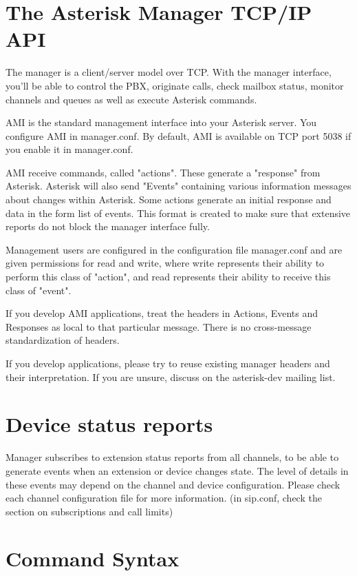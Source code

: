 \section{The Asterisk Manager TCP/IP API}

The manager is a client/server model over TCP. With the manager interface,
you'll be able to control the PBX, originate calls, check mailbox status,
monitor channels and queues as well as execute Asterisk commands.

AMI is the standard management interface into your Asterisk server.
You configure AMI in manager.conf. By default, AMI is available on
TCP port 5038 if you enable it in manager.conf.

AMI receive commands, called "actions". These generate a "response"
from Asterisk. Asterisk will also send "Events" containing various
information messages about changes within Asterisk. Some actions
generate an initial response and data in the form list of events.
This format is created to make sure that extensive reports do not
block the manager interface fully.

Management users are configured in the configuration file manager.conf and are
given permissions for read and write, where write represents their ability
to perform this class of "action", and read represents their ability to
receive this class of "event".

If you develop AMI applications, treat the headers
in Actions, Events and Responses as local to that particular
message. There is no cross-message standardization of headers.

If you develop applications, please try to reuse existing manager
headers and their interpretation. If you are unsure, discuss on
the asterisk-dev mailing list.

\section{Device status reports}

Manager subscribes to extension status reports from all channels,
to be able to generate events when an extension or device changes
state. The level of details in these events may depend on the channel
and device configuration. Please check each channel configuration
file for more information. (in sip.conf, check the section on
subscriptions and call limits)


\section{Command Syntax}

